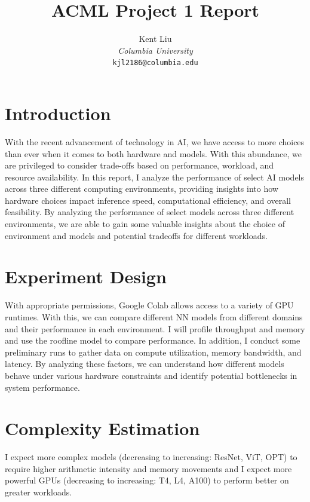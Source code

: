 \documentclass[11pt]{article}
\title{ACML Project 1 Report}
\author{
    Kent Liu \\
    \textit{Columbia University} \\
    \texttt{kjl2186@columbia.edu}
}
\begin{document}
\maketitle

\section*{Introduction}
With the recent advancement of technology in AI, we have access to more choices than ever when it comes to both hardware and models.  With this abundance, we are privileged to consider trade-offs based on performance, workload, and resource availability. In this report, I analyze the performance of select AI models across three different computing environments, providing insights into how hardware choices impact inference speed, computational efficiency, and overall feasibility. By analyzing the performance of select models across three different environments, we are able to gain some valuable insights about the choice of environment and models and potential tradeoffs for different workloads.


\section*{Experiment Design}
With appropriate permissions, Google Colab allows access to a variety of GPU runtimes. With this, we can compare different NN models from different domains and their performance in each environment. I will profile throughput and memory and use the roofline model to compare performance. In addition, I conduct some preliminary runs to gather data on compute utilization, memory bandwidth, and latency. By analyzing these factors, we can understand how different models behave under various hardware constraints and identify potential bottlenecks in system performance.

\section*{Complexity Estimation}
I expect more complex models (decreasing to increasing: ResNet, ViT, OPT) to require higher arithmetic intensity and memory movements and I expect more powerful GPUs (decreasing to increasing: T4, L4, A100) to perform better on greater workloads.
\end{document}
